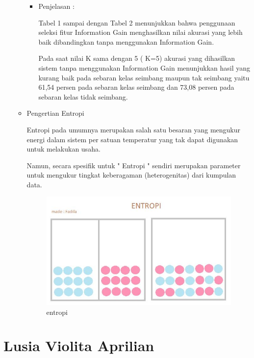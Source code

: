 \begin{enumerate}
\begin{itemize}
\begin{itemize}
\item Penjelasan :
\par Tabel 1 sampai dengan Tabel 2 menunjukkan bahwa penggunaan seleksi fitur Information Gain menghasilkan nilai akurasi yang lebih baik dibandingkan tanpa menggunakan Information Gain. 
\par Pada saat nilai K sama dengan 5 ( K=5) akurasi yang dihasilkan sistem tanpa menggunakan Information Gain menunjukkan hasil yang kurang baik pada sebaran kelas seimbang maupun tak seimbang yaitu 61,54 persen pada sebaran kelas seimbang dan 73,08 persen pada sebaran kelas tidak seimbang. 
\end{itemize}


\par
\item Pengertian Entropi
\par Entropi pada umumnya merupakan salah satu besaran yang mengukur energi dalam sistem per satuan temperatur yang tak dapat digunakan untuk melakukan usaha.
\par Namun, secara spesifik untuk " Entropi " sendiri merupakan parameter untuk mengukur tingkat keberagaman (heterogenitas) dari kumpulan data. 

\par

\begin{figure}[ht]
\centering
\includegraphics[scale=0.5]{figures/entropi.jpg}
\caption{entropi}
\label{contoh}
\end{figure}

\par
\end{itemize}

\end{enumerate}

\section{Lusia Violita Aprilian}

